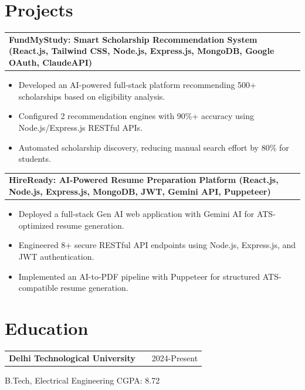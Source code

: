 \documentclass[a4paper,10pt]{article}
\makeatletter
\newenvironment{jobshort}[2]
    {
    \begin{tabularx}{\linewidth}{@{}l X r@{}}
    \textbf{#1} & \hfill &  #2 \\[3.75pt]
    \end{tabularx}
    }
    {
    }
\newenvironment{joblong}[2]
    {
    \begin{tabularx}{\linewidth}{@{}l X r@{}}
    \textbf{#1} & \hfill &  #2 \\[3.75pt]
    \end{tabularx}
    \begin{minipage}[t]{\linewidth}
    \begin{itemize}[nosep,after=\strut, leftmargin=1em, itemsep=3pt,label=--]
    }
    {
    \end{itemize}
    \end{minipage}    
    }
\makeatother
\begin{document}
\section{Projects}


\begin{joblong}{FundMyStudy: Smart Scholarship Recommendation System (React.js, Tailwind CSS, Node.js, Express.js, MongoDB, Google OAuth, ClaudeAPI)}{}
\item Developed an AI-powered full-stack platform recommending 500+ scholarships based on eligibility analysis.
\item Configured 2 recommendation engines with 90\%+ accuracy using Node.js/Express.js RESTful APIs.
\item Automated scholarship discovery, reducing manual search effort by 80\% for students.
\end{joblong}
\vspace{3pt}


\begin{joblong}{HireReady: AI-Powered Resume Preparation Platform (React.js, Node.js, Express.js, MongoDB, JWT, Gemini API, Puppeteer)}{}
\item Deployed a full-stack Gen AI web application with Gemini AI for ATS-optimized resume generation.
\item Engineered 8+ secure RESTful API endpoints using Node.js, Express.js, and JWT authentication.
\item Implemented an AI-to-PDF pipeline with Puppeteer for structured ATS-compatible resume generation.
\end{joblong}
\vspace{3pt}


\section{Education}


\begin{jobshort}{Delhi Technological University}{2024-Present}
\end{jobshort}
B.Tech, Electrical Engineering \hfill CGPA: 8.72\\[6pt]
\end{document}
